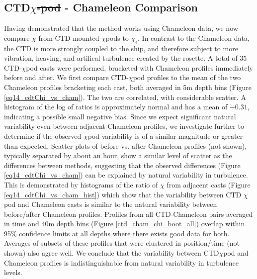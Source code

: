 \documentclass{ametsoc}
\providecommand{\DIFadd}[1]{{\protect\color{blue}\uwave{#1}}} %
\providecommand{\DIFdel}[1]{{\protect\color{red}\sout{#1}}}                      %
\providecommand{\DIFaddbegin}{} %
\providecommand{\DIFaddend}{} %
\providecommand{\DIFdelbegin}{} %
\providecommand{\DIFdelend}{} %
\begin{document}
\subsection{ CTD$\chi$\DIFdelbegin \DIFdel{-pod }\DIFdelend \DIFaddbegin \DIFadd{pod }\DIFaddend - Chameleon Comparison}

Having demonstrated that the method works using Chameleon data, we now compare \DIFdelbegin \DIFdel{$\chi$ }\DIFdelend \DIFaddbegin \DIFadd{$\chi_{\chi}^{ctd}$ }\DIFaddend from CTD-mounted $\chi$pods to \DIFdelbegin \DIFdel{$\chi_{\epsilon}$}\DIFdelend \DIFaddbegin \DIFadd{$\chi_{\epsilon}^{cham}$}\DIFaddend . In contrast to the Chameleon data, the CTD is more strongly coupled to the ship, and therefore subject to more vibration, heaving, and artifical turbulence created by the rosette. A total of 35 CTD-$\chi$pod casts were performed, bracketed with Chameleon profiles immediately before and after. We first compare CTD-$\chi$pod profiles to the mean of the two Chameleon profiles bracketing each cast, both averaged in 5m depth bins (Figure \ref{eq14_cdtChi_vs_cham}). The two are correlated, with considerable scatter. A histogram of the log of ratios is approximately normal and has a mean of $-0.31$, indicating a possible small negative bias. Since we expect significant natural variability even between adjacent Chameleon profiles, we investigate further to determine if the observed $\chi$pod variability is of a similar magnitude or greater than expected. Scatter plots of before vs. after Chameleon profiles (not shown), typically separated by about an hour, show a similar level of scatter as the differences between methods, suggesting that the observed differences (Figure \ref{eq14_cdtChi_vs_cham}) can be explained by natural variability in turbulence. This is demonstrated by histograms of the ratio of $\chi$ from adjacent casts (Figure \ref{eq14_cdtChi_vs_cham_hist}) which show that the variability between CTD $\chi$pod and Chameleon casts is similar to the natural variability between before/after Chameleon profiles. Profiles from all CTD-Chameleon pairs averaged in time and 40m depth bins (Figure \ref{ctd_cham_chi_boot_all}) overlap within 95\% confidence limits at all depths where there exists good data for both. Averages of subsets of these profiles that were clustered in position/time (not shown) also agree well. We conclude that the variability between CTD$\chi$pod and Chameleon profiles is indistinguishable from natural variability in turbulence levels.
\end{document}
